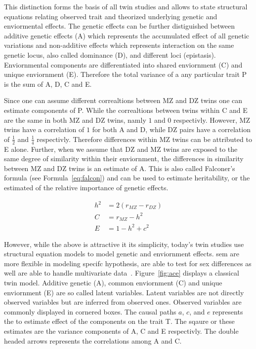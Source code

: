 This distinction forms the basis of all twin studies and allows to state structural equations relating observed trait and theorized underlying genetic and enviormental effects.
The genetic effects can be further distiguished between additive genetic effects (A) which represents the accumulated effect of all genetic variations and non-additive effects which represents interaction on the same genetic locus, also called dominance (D), and different loci (epistasis).
Enviornmental components are differentiated into shared enviornment (C) and unique enviornment (E).
Therefore the total variance of a any particular trait P is the sum of A, D, C and E.

Since one can assume different correaltions between MZ and DZ twins one can estimate components of P.
While the correaltions between twins within C and E are the same in both MZ and DZ twins, namly $1$ and $0$ respectivly.
However, MZ twins have a correlation of $1$ for both A and D, while DZ pairs have a correlation of $\frac{1}{2}$ and $\frac{1}{4}$ respectivly.
Therefore differences within MZ twins can be attributed to E alone.
Further, when we assume that DZ and MZ twins are exposed to the same degree of similarity within their enviornment, the differences in similarity between MZ and DZ twins is an estimate of A.
This is also called Falconer's formula (see Formula~\ref{eq:falcon}) and can be used to estimate heritability, or the estimated of the relative importance of genetic effects.

\begin{align}
  h^2 &= 2(r_{MZ}-r_{DZ})\label{eq:falcon} \\ 
  C &= r_{MZ} - h^2 \nonumber \\
  E &= 1 - h^2 + c^2 \nonumber 
\end{align}

However, while the above is attractive it its simplicity, today's twin studies use structural equation models to model genetic and enviornment effects.
\acrfull{sem} are more flexible in modeling specifc hypothesis, are able to test for sex differences as well are able to handle multivariate data~\cite{Rijsdijk2002}.
Figure~\ref{fig:ace} displays a classical twin model.
Additive genetic (A), common enviornment (C) and unique enviornment (E) are so called latent variables.
Latent variables are not directly observed variables but are inferred from observed ones.
Observed variables are commonly displayed in cornered boxes.
The causal paths $a$, $c$, and $e$ represents the to estimate effect of the components on the trait T.
The sqaure or these estimates are the variance components of A, C and E respectivly.
The double headed arrows represents the correlations among A and C.

